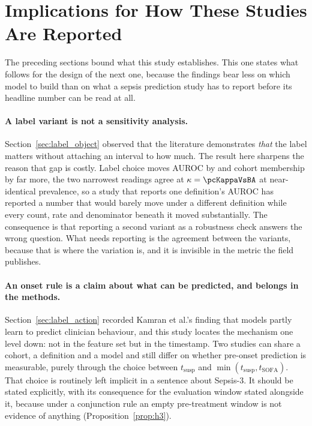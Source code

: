 \section{Implications for How These Studies Are Reported}
\label{sec:implications}

The preceding sections bound what this study establishes. This one states what
follows for the design of the next one, because the findings bear less on which
model to build than on what a sepsis prediction study has to report before its
headline number can be read at all.

\paragraph{A label variant is not a sensitivity analysis.}
Section~\ref{sec:label_object} observed that the literature demonstrates
\emph{that} the label matters without attaching an interval to how much. The
result here sharpens the reason that gap is costly. Label choice moves AUROC by
\pcSpreadLabel{} and cohort membership by far more, the two narrowest
readings agree at $\kappa = \pcKappaVsBA$ at near-identical prevalence, so a
study that reports one definition's AUROC has reported a number that would
barely move under a different definition while every count, rate and
denominator beneath it moved substantially. The consequence is that reporting a
second variant as a robustness check answers the wrong question. What needs
reporting is the agreement between the variants, because that is where the
variation is, and it is invisible in the metric the field publishes.

\paragraph{An onset rule is a claim about what can be predicted, and belongs in
the methods.}
Section~\ref{sec:label_action} recorded Kamran et al.'s finding that models
partly learn to predict clinician behaviour, and this study locates the
mechanism one level down: not in the feature set but in the timestamp. Two
studies can share a cohort, a definition and a model and still differ on
whether pre-onset prediction is measurable, purely through the choice between
$t_{\text{susp}}$ and $\min(t_{\text{susp}}, t_{\text{SOFA}})$. That choice is
routinely left implicit in a sentence about Sepsis-3. It should be stated
explicitly, with its consequence for the evaluation window stated alongside it,
because under a conjunction rule an empty pre-treatment window is not evidence
of anything (Proposition~\ref{prop:h3}).

